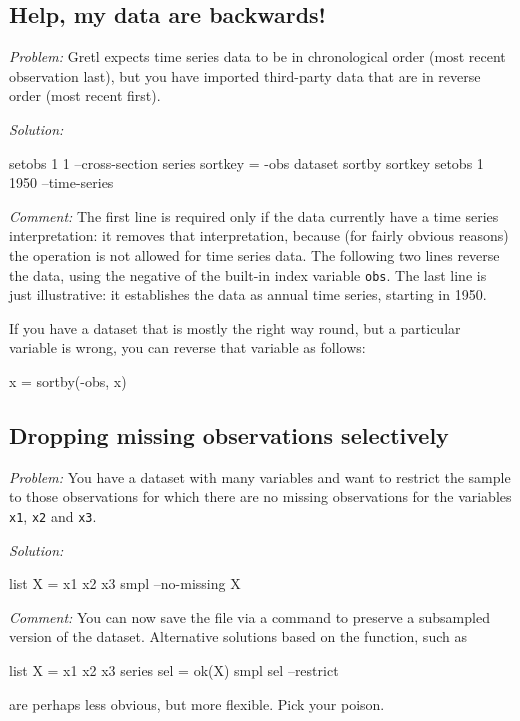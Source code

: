 \subsection{Help, my data are backwards!}

\emph{Problem:} Gretl expects time series data to be in chronological
order (most recent observation last), but you have imported
third-party data that are in reverse order (most recent first).

\emph{Solution:}
\begin{code}
setobs 1 1 --cross-section
series sortkey = -obs
dataset sortby sortkey
setobs 1 1950 --time-series
\end{code}

\emph{Comment:} The first line is required only if the data currently
have a time series interpretation: it removes that interpretation,
because (for fairly obvious reasons) the 
operation is not allowed for time series data.  The following two
lines reverse the data, using the negative of the built-in index
variable \texttt{obs}.  The last line is just illustrative: it
establishes the data as annual time series, starting in 1950.

If you have a dataset that is mostly the right way round, but a
particular variable is wrong, you can reverse that variable as
follows:
\begin{code}
x = sortby(-obs, x)
\end{code}


\subsection{Dropping missing observations selectively}

\emph{Problem:} You have a dataset with many variables and want to
restrict the sample to those observations for which there are no
missing observations for the variables \texttt{x1}, \texttt{x2} and
\texttt{x3}.

\begin{samepage}
\emph{Solution:}
\begin{code}
list X = x1 x2 x3
smpl --no-missing X
\end{code}
\end{samepage}

\emph{Comment:} You can now save the file via a  command
to preserve a subsampled version of the dataset. Alternative solutions
based on the  function, such as
\begin{code}
list X = x1 x2 x3
series sel = ok(X)
smpl sel --restrict
\end{code}
are perhaps less obvious, but more flexible. Pick your poison.


